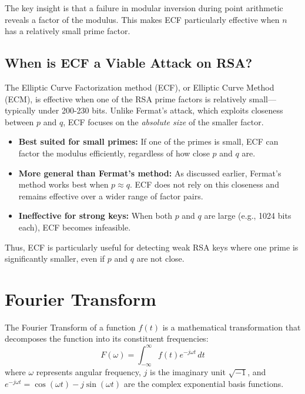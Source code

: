\documentclass{article}
\begin{document}
The key insight is that a failure in modular inversion during point arithmetic reveals a factor of the modulus. This makes ECF particularly effective when $n$ has a relatively small prime factor.

\subsection*{When is ECF a Viable Attack on RSA?}

The Elliptic Curve Factorization method (ECF), or Elliptic Curve Method (ECM), is effective when one of the RSA prime factors is relatively small—typically under 200-230 bits. Unlike Fermat's attack, which exploits closeness between \( p \) and \( q \), ECF focuses on the \emph{absolute size} of the smaller factor.

\begin{itemize}
    \item \textbf{Best suited for small primes:} If one of the primes is small, ECF can factor the modulus efficiently, regardless of how close \( p \) and \( q \) are.
    \item \textbf{More general than Fermat's method:} As discussed earlier, Fermat's method works best when \( p \approx q \). ECF does not rely on this closeness and remains effective over a wider range of factor pairs.
    \item \textbf{Ineffective for strong keys:} When both \( p \) and \( q \) are large (e.g., 1024 bits each), ECF becomes infeasible.
\end{itemize}

\noindent Thus, ECF is particularly useful for detecting weak RSA keys where one prime is significantly smaller, even if \( p \) and \( q \) are not close.


\section{Fourier Transform}

\begin{definitionbox}[title=Fourier Transform]
    The Fourier Transform of a function $f(t)$ is a mathematical transformation that decomposes the function into its constituent frequencies:
    \[
        F(\omega) = \int_{-\infty}^{\infty} f(t) e^{-j\omega t} \, dt
    \]
    where $\omega$ represents angular frequency, $j$ is the imaginary unit $\sqrt{-1}$, and $e^{-j\omega t} = \cos(\omega t) - j\sin(\omega t)$ are the complex exponential basis functions.
\end{definitionbox}
\end{document}
